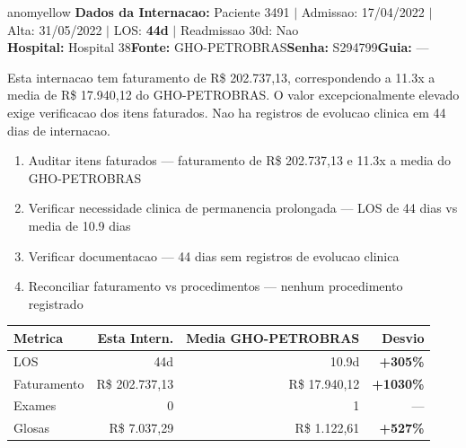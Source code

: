 \documentclass[a4paper,10pt]{article}
\begin{document}
\begin{anomalycard}[Internacao 3047 | GHO-PETROBRAS | MODERADO (z=2.01)]{anomyellow}
\textbf{Dados da Internacao:} Paciente 3491 $\mid$ Admissao: 17/04/2022 $\mid$ Alta: 31/05/2022 $\mid$ LOS: \textbf{44d} $\mid$ Readmissao 30d: Nao\\
\textbf{Hospital:} Hospital 38\quad\textbf{Fonte:} GHO-PETROBRAS\quad\textbf{Senha:} S294799\quad\textbf{Guia:} ---\\
\vspace{2pt}\begin{tcolorbox}[colback=severityred!20,colframe=anomyellow,title={\textbf{Interpretacao de Negocio}},fonttitle=\bfseries\small,left=4pt,right=4pt,top=3pt,bottom=3pt]
{\small Esta internacao tem faturamento de R\$ 202.737,13, correspondendo a 11.3x a media de R\$ 17.940,12 do GHO-PETROBRAS. O valor excepcionalmente elevado exige verificacao dos itens faturados. Nao ha registros de evolucao clinica em 44 dias de internacao.}
\end{tcolorbox}
\begin{tcolorbox}[colback=severityyellow!30,colframe=anomorange,title={\textbf{Recomendacoes Especificas}},fonttitle=\bfseries\small,left=4pt,right=4pt,top=3pt,bottom=3pt]
\begin{enumerate}[nosep,leftmargin=16pt]
\item {\small Auditar itens faturados --- faturamento de R\$ 202.737,13 e 11.3x a media do GHO-PETROBRAS}
\item {\small Verificar necessidade clinica de permanencia prolongada --- LOS de 44 dias vs media de 10.9 dias}
\item {\small Verificar documentacao --- 44 dias sem registros de evolucao clinica}
\item {\small Reconciliar faturamento vs procedimentos --- nenhum procedimento registrado}
\end{enumerate}
\end{tcolorbox}
\begin{center}\begin{tabular}{l r r r}\toprule\textbf{Metrica} & \textbf{Esta Intern.} & \textbf{Media GHO-PETROBRAS} & \textbf{Desvio} \\\midrule
LOS & 44d & 10.9d & \textcolor{anomred}{\textbf{+305\%}} \\
Faturamento & R\$ 202.737,13 & R\$ 17.940,12 & \textcolor{anomred}{\textbf{+1030\%}} \\
Exames & 0 & 1 & --- \\
Glosas & R\$ 7.037,29 & R\$ 1.122,61 & \textcolor{anomred}{\textbf{+527\%}} \\
\bottomrule\end{tabular}\end{center}


\end{anomalycard}
\end{document}
